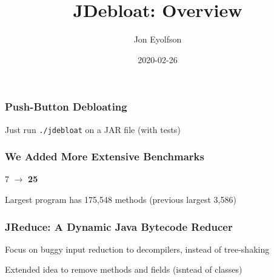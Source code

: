 \documentclass[aspectratio=169]{beamer}
\title{JDebloat: Overview}
\author{Jon Eyolfson}
\date{2020-02-26}
\begin{document}
  \begin{frame}[plain]
    \titlepage
  \end{frame}

  \setcounter{framenumber}{0}

  \begin{frame}
    \frametitle{Push-Button Debloating}

    \begin{center}
    \end{center}

    \vspace{2em}

    Just run \texttt{./jdebloat} on a JAR file (with tests)
  \end{frame}

  \begin{frame}
    \frametitle{We Added More Extensive Benchmarks}

    \begin{center}
      \LARGE 7 $\to$ \textbf{25}
    \end{center}

    \vspace{4em}

    Largest program has 175,548 methods (previous largest 3,586)
  \end{frame}

  \begin{frame}
    \frametitle{JReduce: A Dynamic Java Bytecode Reducer}

    Focus on buggy input reduction to decompilers, instead of tree-shaking

    \vspace{4em}

    Extended idea to remove methods and fields (isntead of classes)
  \end{frame}
\end{document}

